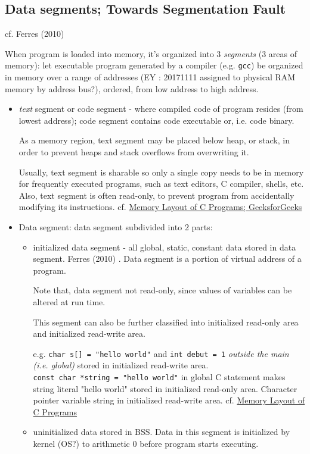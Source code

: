\documentclass[10pt]{amsart}
\begin{document}
\begin{multicols*}{2}
\section{Data segments; Towards Segmentation Fault}

cf. Ferres (2010) \cite{Ferr2010}

When program is loaded into memory, it's organized into 3 \emph{segments} (3 areas of memory):  
let executable program generated by a compiler (e.g. \verb|gcc|) be organized in memory over a range of addresses (EY : 20171111 assigned to physical RAM memory by address bus?), ordered, from low address to high address.  
\begin{itemize}
	\item \emph{text} segment or code segment - where compiled code of program resides (from lowest address); code segment contains code executable or, i.e. code binary.  
	
	As a memory region, text segment may be placed below heap, or stack, in order to prevent heaps and stack overflows from overwriting it.  
	
	Usually, text segment is sharable so only a single copy needs to be in memory for frequently executed programs, such as text editors, C compiler, shells, etc.  Also, text segment is often read-only, to prevent program from accidentally modifying its instructions.  	
	cf. \href{http://www.geeksforgeeks.org/memory-layout-of-c-program/}{Memory Layout of C Programs; GeeksforGeeks}  
	\item Data segment:  data segment subdivided into 2 parts:
	\begin{itemize}
		\item initialized data segment - all global, static, constant data stored in data segment. Ferres (2010) \cite{Ferr2010}.  Data segment is a portion of virtual address of a program.  
		
		Note that, data segment not read-only, since values of variables can be altered at run time.  
		
		This segment can also be further classified into initialized read-only area and initialized read-write area.  
		
		e.g. \verb|char s[] = "hello world"| and \verb|int debut = 1| \emph{outside the main (i.e. global)} stored in initialized read-write area.  \\
		\verb|const char *string = "hello world"| in global C statement makes string literal "hello world" stored in initialized read-only area.  Character pointer variable string in initialized read-write area.  
		cf. \href{http://www.geeksforgeeks.org/memory-layout-of-c-program/}{Memory Layout of C Programs}  
		\item uninitialized data stored in BSS.  Data in this segment is initialized by kernel (OS?) to arithmetic 0 before program starts executing.  
		

\end{itemize}
\end{itemize}
\end{multicols*}
\end{document}
